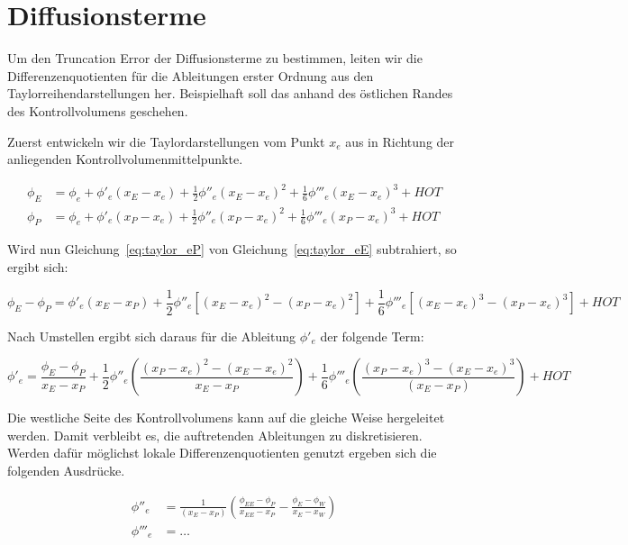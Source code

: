 \documentclass[10pt, ngerman,colorback,accentcolor=tud2d]{tudreport}
\begin{document}
\section{Diffusionsterme}
\label{sec:Diffusionsterme}


Um den Truncation Error der Diffusionsterme zu bestimmen, leiten wir die Differenzenquotienten
für die Ableitungen erster Ordnung aus den Taylorreihendarstellungen her. Beispielhaft
soll das anhand des östlichen Randes des Kontrollvolumens geschehen.

Zuerst entwickeln wir die Taylordarstellungen vom Punkt $x_e$ aus in Richtung der anliegenden
Kontrollvolumenmittelpunkte.

\begin{align}
  \phi_E &= \phi_e + \phi'_e(x_E-x_e)+\frac{1}{2}\phi''_e(x_E-x_e)^2
  +\frac{1}{6}\phi'''_e(x_E-x_e)^3+HOT
  \label{eq:taylor_eE}\\
  \phi_P &= \phi_e + \phi'_e(x_P-x_e)+\frac{1}{2}\phi''_e(x_P-x_e)^2
  +\frac{1}{6}\phi'''_e(x_P-x_e)^3+HOT
  \label{eq:taylor_eP}
\end{align}

Wird nun Gleichung~\ref{eq:taylor_eP} von Gleichung~\ref{eq:taylor_eE} subtrahiert, 
so ergibt sich:

\begin{equation*}
  \phi_E-\phi_P=\phi'_e(x_E-x_P)+
  \frac{1}{2}\phi''_e\left[{{(x_E-x_e)}^2-{(x_P-x_e)}^2}\right]+
  \frac{1}{6}\phi'''_e\left[{{(x_E-x_e)}^3-{(x_P-x_e)}^3}\right]+HOT
\end{equation*}

Nach Umstellen ergibt sich daraus für die Ableitung $\phi'_e$ der folgende Term:

\begin{equation}
  \phi'_e = \frac{\phi_E-\phi_P}{x_E-x_P}+\frac{1}{2}\phi''_e
\left({\frac{{(x_P-x_e)}^2-{(x_E-x_e)}^2}{x_E-x_P}}\right)+
\frac{1}{6} \phi'''_e \left({\frac{{(x_P-x_e)}^3-{(x_E-x_e)}^3}{(x_E-x_P)}}\right)+HOT
\end{equation}


Die westliche Seite des Kontrollvolumens kann auf die gleiche Weise hergeleitet werden.
Damit verbleibt es, die auftretenden Ableitungen zu diskretisieren. Werden dafür
möglichst lokale Differenzenquotienten genutzt ergeben sich die folgenden Ausdrücke.

\begin{align*}
  \phi''_e &= \frac{1}{(x_E-x_P)}\left({
\frac{\phi_{EE}-\phi_P}{x_{EE}-x_P}-\frac{\phi_E-\phi_W}{x_E-x_W}}\right)\\
 \phi'''_e &= \dots
\end{align*}
\end{document}
